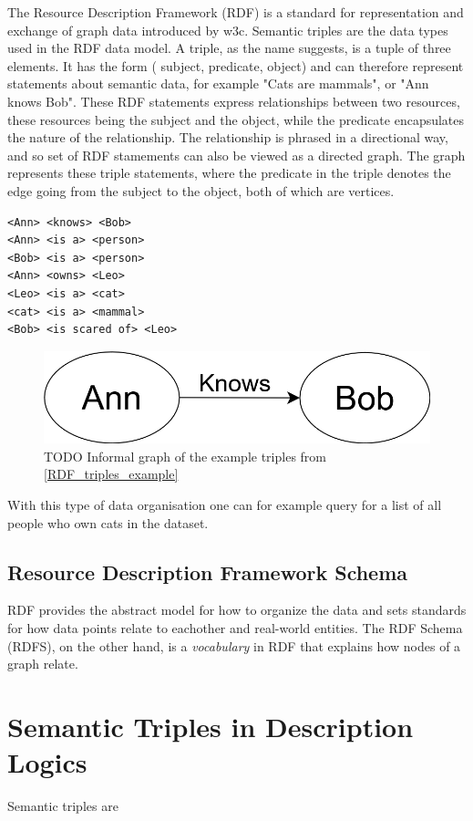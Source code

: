 The Resource Description Framework (RDF) is a standard for representation and exchange of graph data introduced by \gls{w3c}. Semantic triples are the data types used in the RDF data model. A triple, as the name suggests, is a tuple of three elements. It has the form ( subject, predicate, object) and can therefore represent statements about semantic data, for example "Cats are mammals", or "Ann knows Bob". These RDF statements express relationships between two resources, these resources being the subject and the object, while the predicate encapsulates the nature of the relationship. The relationship is phrased in a directional way, and so set of RDF stamements can also be viewed as a directed graph. The graph represents these triple statements, where the predicate in the triple denotes the edge going from the subject to the object, both of which are vertices.

\begin{lstlisting}[caption={Example of RDF triple set written in informal pseudocode},label={RDF_triples_example}]
<Ann> <knows> <Bob>
<Ann> <is a> <person>
<Bob> <is a> <person>
<Ann> <owns> <Leo>
<Leo> <is a> <cat>
<cat> <is a> <mammal>
<Bob> <is scared of> <Leo>
\end{lstlisting}

\begin{figure}
\centering
    \includegraphics[scale=0.3]{figures/RDF_triple}
    \caption{TODO Informal graph of the example triples from \ref{RDF_triples_example}}
    
    \label{fig:RDF_figure}
\end{figure}

With this type of data organisation one can for example query for a list of all people who own cats in the dataset.

\subsection{Resource Description Framework Schema}
RDF provides the abstract model for how to organize the data and sets standards for how data points relate to eachother and real-world entities. The RDF Schema (RDFS), on the other hand, is a \emph{vocabulary} in RDF that explains how nodes of a graph relate.

\section{Semantic Triples in Description Logics}
Semantic triples are 
\fi
